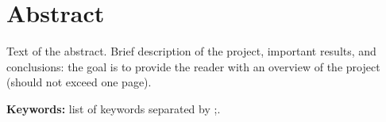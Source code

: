 \chapter*{Abstract}\label{ch:abstract}
Text of the abstract.
Brief description of the project, important results, and conclusions: the goal is to provide the reader with an overview of the project (should not exceed one page).

\textbf{Keywords:} list of keywords separated by ;.
